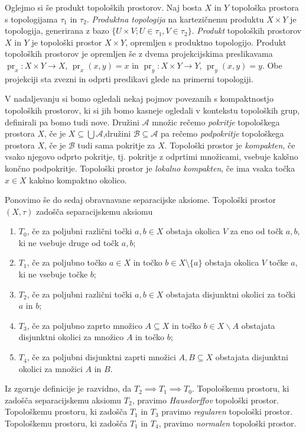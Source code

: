 \documentclass[mat1]{fmfdelo}
\DeclareMathOperator{\pr}{pr}
\begin{document}
Oglejmo si še produkt topoloških prostorov.
Naj bosta $X$ in $Y$ topološka prostora s topologijama $\tau_1$ in $\tau_2$. \emph{Produktna topologija} na kartezičnemu produktu $X \times Y$ je topologija, generirana z bazo $\lbrace U \times V ; U \in \tau_1, V \in \tau_2 \rbrace$. \emph{Produkt} topoloških prostorov $X$ in $Y$ je topološki prostor $X \times Y$, opremljen s produktno topologijo. Produkt topoloških prostorov je opremljen še z dvema projekcijskima preslikavama $\pr_x\colon X \times Y \to X$, $\pr_x(x, y) = x$ in $\pr_y\colon X \times Y \to Y$, $\pr_y(x, y) = y$. Obe projekciji sta zvezni in odprti preslikavi glede na primerni topologiji.

V nadaljevanju si bomo ogledali nekaj pojmov povezanih s kompaktnostjo topoloških prostorov, ki si jih bomo kasneje ogledali v kontekstu topoloških grup, definirali pa bomo tudi nove.
Družini $\mathcal{A}$ množic rečemo \emph{pokritje} topološkega prostora $X$, če je $X \subseteq \bigcup \mathcal{A}$,družini $\mathcal{B} \subseteq \mathcal{A}$ pa rečemo \emph{podpokritje} topološkega prostora $X$, če je $\mathcal{B}$ tudi sama pokritje za $X$.
Topološki prostor je \emph{kompakten}, če vsako njegovo odprto pokritje, tj. pokritje z odprtimi množicami, vsebuje kakšno končno podpokritje.
Topološki prostor je \emph{lokalno kompakten}, če ima vsaka točka $x \in X$ kakšno kompaktno okolico.

Ponovimo še do sedaj obravnavane separacijske aksiome.
Topološki prostor $(X, \tau)$ zadošča separacijskemu aksiomu
\begin{enumerate}
\item $T_0$, če za poljubni različni točki $a, b \in X$ obstaja okolica $V$ za eno od točk $a, b$, ki ne vsebuje druge od točk $a, b$;
\item $T_1$, če za poljubno točko $a \in X$ in točko $b \in X\setminus\lbrace a \rbrace$ obstaja okolica $V$ točke $a$, ki ne vsebuje točke $b$;
\item $T_2$, če za poljubni različni točki $a, b \in X$ obstajata disjunktni okolici za točki $a$ in $b$;
\item $T_3$, če za poljubno zaprto množico $A \subseteq X$ in točko $b \in X\backslash A$ obstajata disjunktni okolici za množico $A$ in točko $b$;
\item $T_4$, če za poljubni disjunktni zaprti množici $A, B \subseteq X$ obstajata disjunktni okolici za množici $A$ in $B$.
\end{enumerate}

Iz zgornje definicije je razvidno, da $T_2 \implies T_1 \implies T_0$.
Topološkemu prostoru, ki zadošča separacijskemu aksiomu $T_2$, pravimo \emph{Hausdorffov} topološki prostor.
Topološkemu prostoru, ki zadošča $T_1$ in $T_3$ pravimo \emph{regularen} topološki prostor.
Topološkemu prostoru, ki zadošča $T_1$ in $T_4$, pravimo \emph{normalen} topološki prostor.
\end{document}

